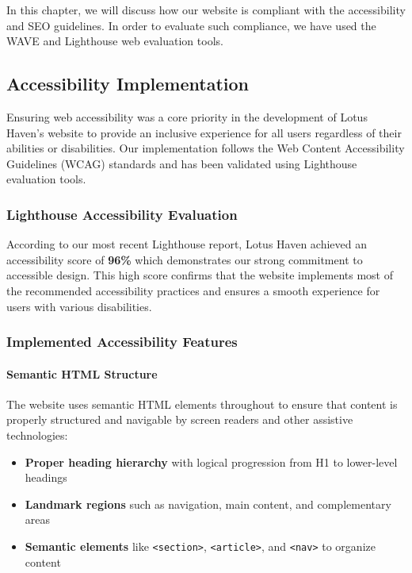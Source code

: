 In this chapter, we will discuss how our website is compliant with the accessibility and
SEO guidelines. In order to evaluate such compliance, we have used the WAVE and
Lighthouse web evaluation tools.

\subsection{Accessibility Implementation}

Ensuring web accessibility was a core priority in the development of Lotus Haven's website to provide an inclusive experience for all users regardless of their abilities or disabilities. Our implementation follows the Web Content Accessibility Guidelines (WCAG) standards and has been validated using Lighthouse evaluation tools.

\subsubsection{Lighthouse Accessibility Evaluation}

According to our most recent Lighthouse report, Lotus Haven achieved an accessibility score of \textbf{96\%} which demonstrates our strong commitment to accessible design. This high score confirms that the website implements most of the recommended accessibility practices and ensures a smooth experience for users with various disabilities.

\subsubsection{Implemented Accessibility Features}

\paragraph{Semantic HTML Structure}
The website uses semantic HTML elements throughout to ensure that content is properly structured and navigable by screen readers and other assistive technologies:

\begin{itemize}
    \item \textbf{Proper heading hierarchy} with logical progression from H1 to lower-level headings
    \item \textbf{Landmark regions} such as navigation, main content, and complementary areas
    \item \textbf{Semantic elements} like \texttt{<section>}, \texttt{<article>}, and \texttt{<nav>} to organize content
\end{itemize}

